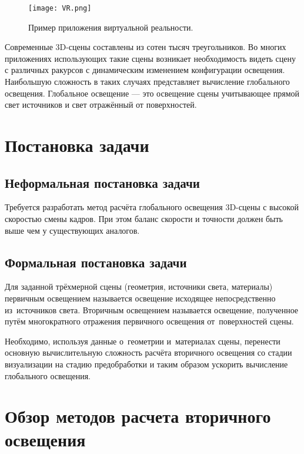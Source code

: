 \documentclass[12pt,fleqn]{article}
\begin{document}
\begin{figure}[htb]
    \centering
    \texttt{[image: VR.png]}
    \caption{Пример приложения виртуальной реальности.}
    \label{VR}
\end{figure}

Современные 3D-сцены составлены из сотен тысяч треугольников. Во многих приложениях использующих такие сцены возникает необходимость видеть сцену с различных ракурсов с динамическим изменением конфигурации освещения. Наибольшую сложность в таких случаях представляет вычисление глобального освещения. Глобальное освещение --- это освещение сцены учитывающее прямой свет источников и свет отражённый от поверхностей.

\pagebreak

\section{Постановка задачи}

\subsection{Неформальная постановка задачи}

Требуется разработать метод расчёта глобального освещения 3D-сцены с высокой скоростью смены кадров. При этом баланс скорости и точности должен быть выше чем у существующих аналогов.

\subsection{Формальная постановка задачи}

Для заданной трёхмерной сцены (геометрия, источники света, материалы) первичным освещением называется освещение исходящее непосредственно из~источников света. Вторичным освещением называется освещение, полученное путём многократного отражения первичного освещения от~поверхностей сцены.

Необходимо, используя данные о~геометрии и~материалах сцены, перенести основную вычислительную сложность расчёта вторичного освещения со стадии визуализации на стадию предобработки и таким образом ускорить вычисление глобального освещения.

\pagebreak

\section{Обзор методов расчета вторичного освещения}
\end{document}
